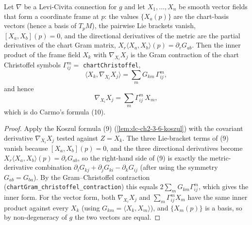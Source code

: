 \begin{lemma}
  \label{lem:dc-ch2-2-2-c-formula10}
  \leanok
  Let $\nabla$ be a Levi-Civita connection for $g$ and let $X_1,\dots,X_n$ be smooth vector
  fields that form a coordinate frame at $p$: the values $\{X_a(p)\}$ are the chart-basis
  vectors (hence a basis of $T_pM$), the pairwise Lie brackets vanish, $[X_a,X_b](p)=0$, and the
  directional derivatives of the metric are the partial derivatives of the chart Gram matrix,
  $X_r\langle X_a,X_b\rangle(p)=\partial_r G_{ab}$. Then the inner product of the frame field
  $X_k$ with $\nabla_{X_i}X_j$ is the Gram contraction of the chart Christoffel symbols
  $\Gamma^m_{ij}=$ \texttt{chartChristoffel},
  $$\langle X_k,\nabla_{X_i}X_j\rangle=\sum_m G_{km}\,\Gamma^m_{ij},$$
  and hence
  $$\nabla_{X_i}X_j=\sum_m\Gamma^m_{ij}\,X_m,$$
  which is do Carmo's formula (10).
  \begin{proof}
    \leanok
    Apply the Koszul formula (9) (\cref{lem:dc-ch2-3-6-koszul}) with the covariant derivative
    $\nabla_{X_i}X_j$ tested against $Z=X_k$. The three Lie-bracket terms of (9) vanish because
    $[X_a,X_b](p)=0$, and the three directional derivatives become
    $X_r\langle X_a,X_b\rangle(p)=\partial_r G_{ab}$, so the right-hand side of (9) is exactly the
    metric-derivative combination $\partial_i G_{kj}+\partial_j G_{ki}-\partial_k G_{ij}$
    (after using the symmetry $G_{ab}=G_{ba}$). By the Gram--Christoffel contraction
    (\texttt{chartGram\_christoffel\_contraction}) this equals $2\sum_m G_{km}\Gamma^m_{ij}$,
    which gives the inner form. For the vector form, both $\nabla_{X_i}X_j$ and
    $\sum_m\Gamma^m_{ij}X_m$ have the same inner product against every $X_k$
    (using $G_{km}=\langle X_k,X_m\rangle$), and $\{X_m(p)\}$ is a basis, so by non-degeneracy of
    $g$ the two vectors are equal.
  \end{proof}
\end{lemma}

